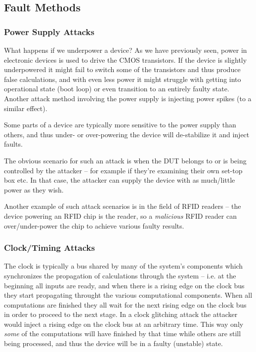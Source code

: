 \subsection{Fault Methods}

\subsubsection{Power Supply Attacks}
What happens if we underpower a device?
As we have previously seen, power in electronic devices is used to drive the CMOS transistors. If the device is slightly underpowered it might fail to switch some of the transistors and thus produce false calculations, and with even less power it might  struggle with getting into operational state (boot loop) or even transition to an entirely faulty state.
Another attack method involving the power supply is injecting power spikes (to a similar effect).

Some parts of a device are typically more sensitive to the power supply than others, and thus under- or over-powering the device will de-stabilize it and inject faults.

The obvious scenario for such an attack is when the DUT belongs to or is being controlled by the attacker -- for example if they're examining their own set-top box etc. In that case, the attacker can supply the device with as much/little power as they wish.

Another example of such attack scenarios is in the field of RFID readers -- the device powering an RFID chip is the reader, so a \emph{malicious} RFID reader can over/under-power the chip to achieve various faulty results.

\subsubsection{Clock/Timing Attacks}
The clock is typically a bus shared by many of the system's components which synchronizes the propagation of calculations through the system -- i.e. at the beginning all inputs are ready, and when there is a rising edge on the clock bus they start propagating throught the various computational components. When all computations are finished they all wait for the next rising edge on the clock bus in order to proceed to the next stage.
In a clock glitching attack the attacker would inject a rising edge on the clock bus at an arbitrary time. This way only \emph{some} of the computations will have finished by that time while others are still being processed, and thus the device will be in a faulty (unstable) state.


